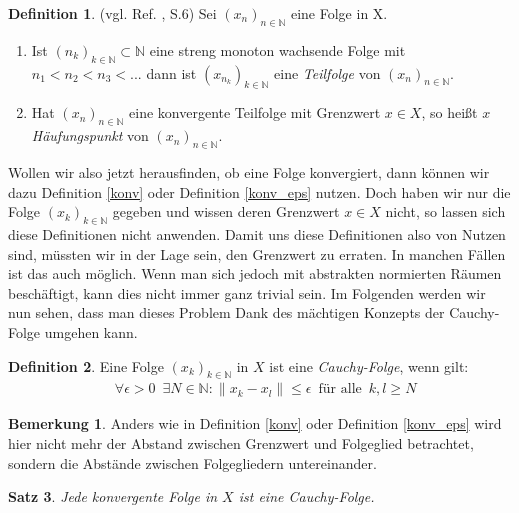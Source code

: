 \documentclass[10pt,a4paper]{article}
\theoremstyle{plain}
\newtheorem{satz}{Satz}[section]
\newenvironment{sa}{\begin{shaded}\begin{satz}}{\end{satz}\end{shaded}}
\theoremstyle{definition}
\newtheorem{definition}[satz]{Definition}
\newenvironment{dfi}{\begin{shaded}\begin{definition}}{\end{definition}\end{shaded}}
\theoremstyle{nonumberplain}
\newtheorem{bemerkung}{Bemerkung}
\newenvironment{bem}{\begin{bemerkung}}{\end{bemerkung}}
\newcommand{\N}{\mathbb{N}}
\begin{document}
\begin{dfi}
(vgl. Ref. \cite{Clason}, S.6) Sei ${(x_n)}_{n \in \N}$ eine Folge in X.
\begin{enumerate}[label=(\roman*)]
\item Ist ${(n_k)}_{k \in \N} \subset \N$ eine streng monoton wachsende Folge mit $n_1 < n_2 < n_3 < ...$ dann ist ${(x_{n_k})}_{k \in \N}$ eine \textit{Teilfolge} von ${(x_n)}_{n \in \N}$.
\item Hat ${(x_n)}_{n \in \N}$ eine konvergente Teilfolge mit Grenzwert $x \in X$, so heißt $x$ \textit{Häufungspunkt} von ${(x_n)}_{n \in \N}$.
\end{enumerate}
\end{dfi}
Wollen wir also jetzt herausfinden, ob eine Folge konvergiert, dann können wir dazu Definition \hyperref[konv]{\ref*{konv}} oder Definition \hyperref[konv_eps]{\ref*{konv_eps}} nutzen. Doch haben wir nur die Folge ${(x_k)}_{k \in \N}$ gegeben und wissen deren Grenzwert $x \in X$ nicht, so lassen sich diese Definitionen nicht anwenden. Damit uns diese Definitionen also von Nutzen sind, müssten wir in der Lage sein, den Grenzwert zu erraten. In manchen Fällen ist das auch möglich. Wenn man sich jedoch mit abstrakten normierten Räumen beschäftigt, kann dies nicht immer ganz trivial sein. Im Folgenden werden wir nun sehen, dass man dieses Problem Dank des mächtigen Konzepts der Cauchy-Folge umgehen kann.
\begin{dfi}
\label{konv_cau}
Eine Folge ${(x_k)}_{k \in \N}$ in $X$ ist eine \textit{Cauchy-Folge}, wenn gilt:
\begin{align*}
& \forall \epsilon > 0 \enspace \exists N \in \N : \|x_k - x_l\| \leq \epsilon \enspace \text{für alle} \enspace k,l \geq N
\end{align*}
\end{dfi}
\begin{bem}
Anders wie in Definition \hyperref[konv]{\ref*{konv}} oder Definition \hyperref[konv_eps]{\ref*{konv_eps}} wird hier nicht mehr der Abstand zwischen Grenzwert und Folgeglied betrachtet, sondern die Abstände zwischen Folgegliedern untereinander.
\end{bem}
\begin{sa}
\label{konv_ist_cauchy}
Jede konvergente Folge in $X$ ist eine Cauchy-Folge.
\end{sa}
\end{document}

